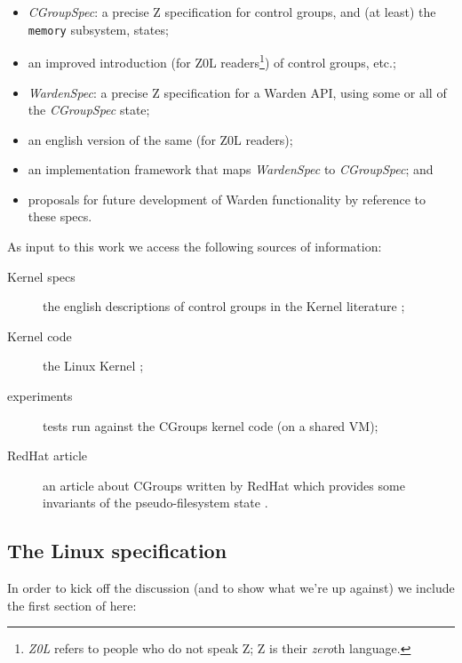 \documentclass[a4paper,twoside,12pt]{article}
\begin{document}
\begin{itemize}
\item \emph{CGroupSpec}: a precise Z specification for control groups, and (at least) the \texttt{memory} subsystem, states;
\item an improved introduction (for Z0L readers\footnote{\emph{Z0L} refers to people who do not speak Z; Z is their \emph{zero}th language.}) of control groups, etc.;
\item \emph{WardenSpec}: a precise Z specification for a Warden API, using some or all of the \emph{CGroupSpec} state;
\item an english version of the same (for Z0L readers);
\item an implementation framework that maps \emph{WardenSpec} to \emph{CGroupSpec}; and
\item proposals for future development of Warden functionality by reference to these specs.
\end{itemize}
As input to this work we access the following sources of information:
\begin{description}
\item[Kernel specs] the english descriptions of control groups in the Kernel literature \cite{linuxgroups};
\item[Kernel code] the Linux Kernel \cite{linuxkernel};
\item[experiments] tests run against the CGroups kernel code (on a shared VM);
\item[RedHat article] an article about CGroups written by RedHat which provides some invariants of the pseudo-filesystem state \cite{rharticle}.
\end{description}

\subsection{The Linux specification \cite{linuxgroups}}

In order to kick off the discussion (and to show what we're up against) we include the first section of \cite{linuxgroups} here:
\end{document}
